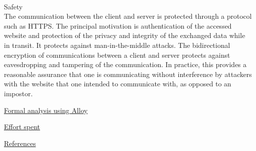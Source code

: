\documentclass{article}
\begin{document}
\begin{legal}
\begin{legal}
\begin{legal}
			\\
			\item Safety\\
			{\normalfont The communication between the client and server is protected through a protocol such as HTTPS. The principal motivation is authentication of the accessed website and protection of the privacy and integrity of the exchanged data while in transit. It protects against man-in-the-middle attacks. The bidirectional encryption of communications between a client and server protects against eavesdropping and tampering of the communication. In practice, this provides a reasonable assurance that one is communicating without interference by attackers with the website that one intended to communicate with, as opposed to an impostor. 			}
			\\
		\end{legal}
		\end{legal}
	\item \underline{Formal analysis using Alloy}\\
	\item \underline{Effort spent}\\
	\item \underline{References}\\
	\end{legal}
\end{document}
